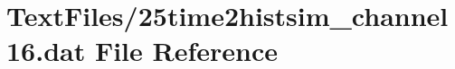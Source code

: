 \hypertarget{25time2histsim__channel16_8dat}{}\section{Text\+Files/25time2histsim\+\_\+channel16.dat File Reference}
\label{25time2histsim__channel16_8dat}
